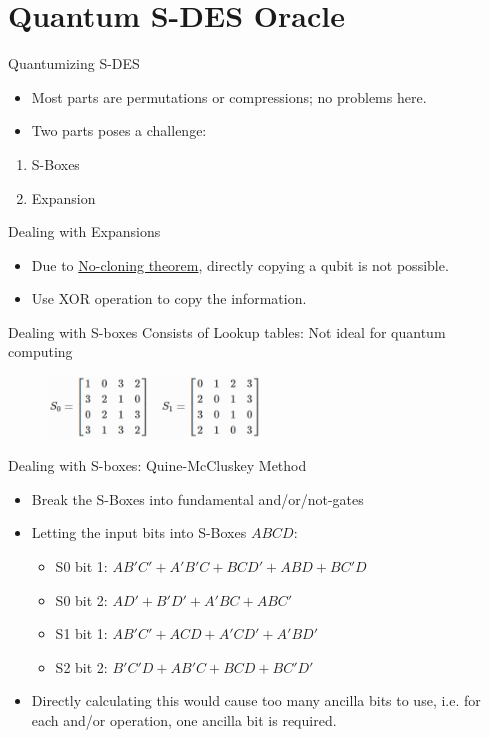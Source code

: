 \documentclass{beamer}
\begin{document}
	\section{Quantum S-DES Oracle}
	
	\begin{frame}{Quantumizing S-DES}
		\begin{itemize}
			\item Most parts are permutations or compressions; no problems here.
			\item Two parts poses a challenge:
		\end{itemize}
		\begin{enumerate}
			\item S-Boxes
			\item Expansion
		\end{enumerate}
	\end{frame}
	
	\begin{frame}{Dealing with Expansions}
		\begin{itemize}
			\item Due to \href{https://en.wikipedia.org/wiki/No-cloning_theorem}{No-cloning theorem}, directly copying a qubit is not possible.
			\item Use XOR operation to copy the information.
		\end{itemize}
	\end{frame}
	
	\begin{frame}{Dealing with S-boxes}
		Consists of Lookup tables: Not ideal for quantum computing
		\begin{figure}[h]
			\centering
			\includegraphics[width=0.5\textwidth]{./Images/sbox.png}
		\end{figure}
	\end{frame}
	
	\begin{frame}{Dealing with S-boxes: Quine-McCluskey Method}
		\begin{itemize}
			\item Break the S-Boxes into fundamental and/or/not-gates
			\item Letting the input bits into S-Boxes $ABCD$:
			\begin{itemize}
				\item S0 bit 1: $AB'C'+A'B'C+BCD'+ABD+BC'D$
				\item S0 bit 2: $AD'+B'D'+A'BC+ABC'$
				\item S1 bit 1: $AB'C'+ACD+A'CD'+A'BD'$
				\item S2 bit 2: $B'C'D+AB'C+BCD+BC'D'$
			\end{itemize}
			\item Directly calculating this would cause too many ancilla bits to use, i.e. for each and/or operation, one ancilla bit is required.
		\end{itemize}
	\end{frame}
	
\end{document}
